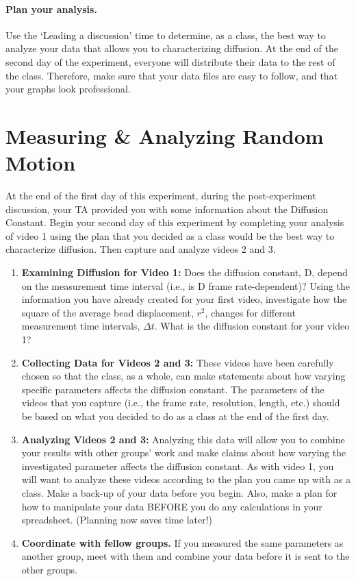 \paragraph*{Plan your analysis.} Use the `Leading a discussion' time to determine, as a class, the best way to analyze your data that allows you to characterizing diffusion.
At the end of the second day of the experiment,  everyone will distribute their data to the rest of the class.
Therefore, make sure that your data files are easy to follow, and that your graphs look professional.

\section{Measuring \& Analyzing Random Motion}
At the end of the first day of this experiment, during the post-experiment discussion, your TA provided you with some information about the Diffusion Constant. 
Begin your second day of this experiment by completing your analysis of video 1 using the plan that you decided as a class would be the best way to characterize diffusion.
Then capture and analyze videos 2 and 3.
\begin{enumerate}
\item \textbf{Examining Diffusion for Video 1:} Does the diffusion constant, D, depend on the measurement time interval (i.e., is D frame rate-dependent)? Using the information you have already created for your first video, investigate how the square of the average bead displacement, $r^{2}$, changes for different measurement time intervals, $\Delta t$. What is the diffusion constant for your video 1?
\item \textbf{Collecting Data for Videos 2 and 3:} These videos have been carefully chosen so that the class, as a whole, can make statements about how varying specific parameters affects the diffusion constant. The parameters of the videos that you capture (i.e., the frame rate, resolution, length, etc.) should be based on what you decided to do as a class at the end of the first day. 
\item \textbf{Analyzing Videos 2 and 3:} Analyzing this data will allow you to combine your results with other groups' work and make claims about how varying the investigated parameter affects the diffusion constant. As with video 1, you will want to analyze these videos according to the plan you came up with as a class. Make a back-up of your data before you begin. Also, make a plan for how to manipulate your data BEFORE you do any calculations in your spreadsheet. (Planning now saves time later!)
\item \textbf{Coordinate with fellow groups.} If you measured the same parameters as another group, meet with them and combine your data before it is sent to the other groups.
\end{enumerate}

